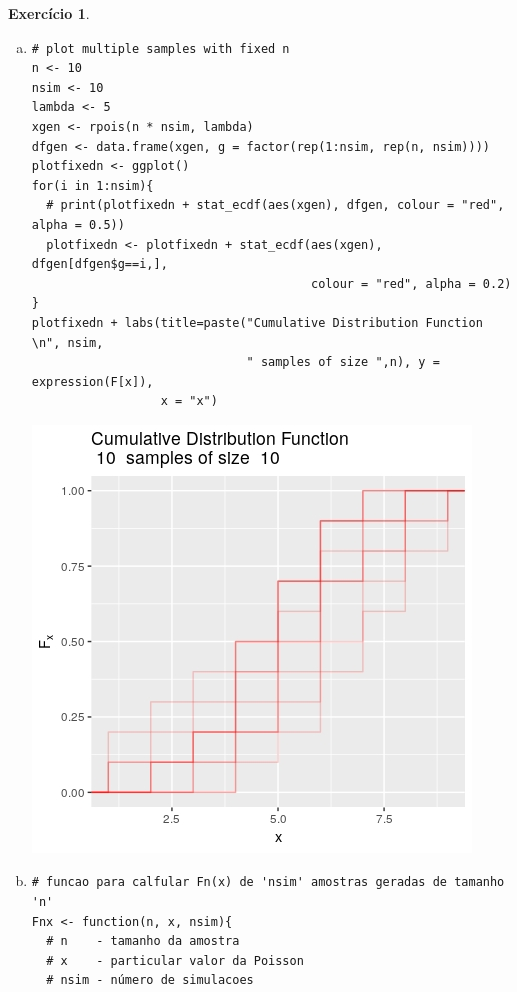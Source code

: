 \documentclass[letter,11pt]{article}
\newtheorem{exer}{Exercício}
\begin{document}
\begin{exer}
\begin{enumerate}[a)]
  \item 
    \begin{verbatim}
# plot multiple samples with fixed n
n <- 10
nsim <- 10
lambda <- 5
xgen <- rpois(n * nsim, lambda)
dfgen <- data.frame(xgen, g = factor(rep(1:nsim, rep(n, nsim))))
plotfixedn <- ggplot() 
for(i in 1:nsim){
  # print(plotfixedn + stat_ecdf(aes(xgen), dfgen, colour = "red", alpha = 0.5))
  plotfixedn <- plotfixedn + stat_ecdf(aes(xgen), dfgen[dfgen$g==i,], 
                                       colour = "red", alpha = 0.2)
}
plotfixedn + labs(title=paste("Cumulative Distribution Function \n", nsim, 
                              " samples of size ",n), y = expression(F[x]), 
                  x = "x")
  \end{verbatim}
  \includegraphics[scale=0.5]{exe_ecdf2}
  
  \item 
  \begin{verbatim}
# funcao para calfular Fn(x) de 'nsim' amostras geradas de tamanho 'n'
Fnx <- function(n, x, nsim){
  # n    - tamanho da amostra
  # x    - particular valor da Poisson
  # nsim - número de simulacoes
  

\end{verbatim}
\end{enumerate}
\end{exer}
\end{document}
